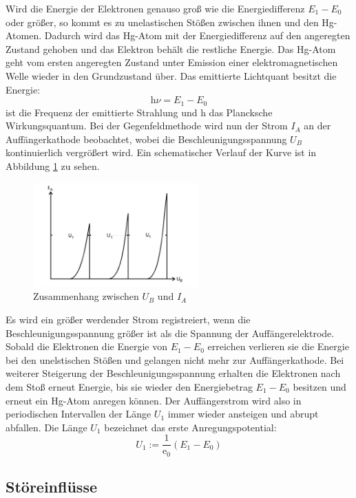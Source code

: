 Wird die Energie der Elektronen genauso groß wie die Energiedifferenz $E_1 -E_0$ oder größer, so kommt es zu unelastischen Stößen zwischen ihnen und den Hg-Atomen.
Dadurch wird das Hg-Atom mit der Energiedifferenz auf den angeregten Zustand gehoben und das Elektron behält die restliche Energie.
Das Hg-Atom geht vom ersten angeregten Zustand unter Emission einer elektromagnetischen Welle wieder in den Grundzustand über.
Das emittierte Lichtquant besitzt die Energie:
\begin{equation}
    \text{h} \nu = E_1 - E_0
    \label{eqn:gl3}
\end{equation}
\nu ist die Frequenz der emittierte Strahlung und h das Plancksche Wirkungsquantum.
Bei der Gegenfeldmethode wird nun der Strom $I_A$ an der Auffängerkathode beobachtet, wobei die Beschleunigungsspannung $U_B$ kontinuierlich vergrößert wird. 
Ein schematischer Verlauf der Kurve ist in Abbildung \ref{fig:abb2} zu sehen. 
\begin{figure}
    \centering
    \includegraphics[height=4.0cm]{data/abb2.jpg}
    \caption{Zusammenhang zwischen $U_B$ und $I_A$  \cite{V601}}
    \label{fig:abb2}
\end{figure}
Es wird ein größer werdender Strom registreiert, wenn die Beschleunigungsspannung größer ist als die Spannung der Auffängerelektrode.
Sobald die Elektronen die Energie von $E_1 - E_0$ erreichen verlieren sie die Energie bei den unelstischen Stößen und gelangen nicht mehr zur Auffängerkathode.
Bei weiterer Steigerung der Beschleunigungsspannung erhalten die Elektronen nach dem Stoß erneut Energie, bis sie wieder den Energiebetrag $E_1 -E_0$ besitzen und erneut ein Hg-Atom anregen können.
Der Auffängerstrom wird also in periodischen Intervallen der Länge $U_1$ immer wieder ansteigen und abrupt abfallen. 
Die Länge $U_1$ bezeichnet das erste Anregungspotential:
\begin{equation}
    U_1 := \frac{1}{\text{e}_0}(E_1 - E_0)
    \label{eqn:gl4}
\end{equation}

\subsection{Störeinflüsse}
\label{Stoer}

